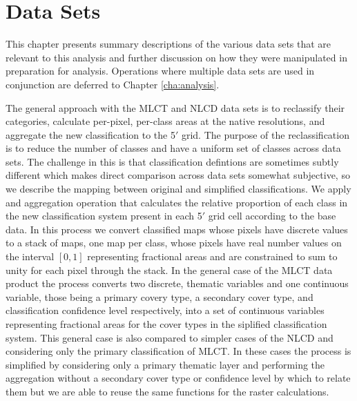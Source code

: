 








\graphicspath{ {datasets/} }


\chapter{Data Sets}
\label{cha:datasets}

This chapter presents summary descriptions of the various data sets
that are relevant to this analysis and further discussion on how they
were manipulated in preparation for analysis.  Operations where
multiple data sets are used in conjunction are deferred to Chapter
\ref{cha:analysis}.

The general approach with the MLCT and NLCD data sets is to reclassify
their categories, calculate per-pixel, per-class areas at the native
resolutions, and aggregate the new classification to the 5$'$ grid.
The purpose of the reclassification is to reduce the number of classes
and have a uniform set of classes across data sets.  The challenge in
this is that classification defintions are sometimes subtly different
which makes direct comparison across data sets somewhat subjective, so
we describe the mapping between original and simplified
classifications.  We apply and aggregation operation that calculates
the relative proportion of each class in the new classification system
present in each 5$'$ grid cell according to the base data.  In this
process we convert classified maps whose pixels have discrete values
to a stack of maps, one map per class, whose pixels have real number
values on the interval $[0,1]$ representing fractional areas and are
constrained to sum to unity for each pixel through the stack.  In the
general case of the MLCT data product the process converts two
discrete, thematic variables and one continuous variable, those being
a primary covery type, a secondary cover type, and classification
confidence level respectively, into a set of continuous variables
representing fractional areas for the cover types in the siplified
classification system.  This general case is also compared to simpler
cases of the NLCD and considering only the primary classification of
MLCT.  In these cases the process is simplified by considering only a
primary thematic layer and performing the aggregation without a
secondary cover type or confidence level by which to relate them but
we are able to reuse the same functions for the raster calculations.

